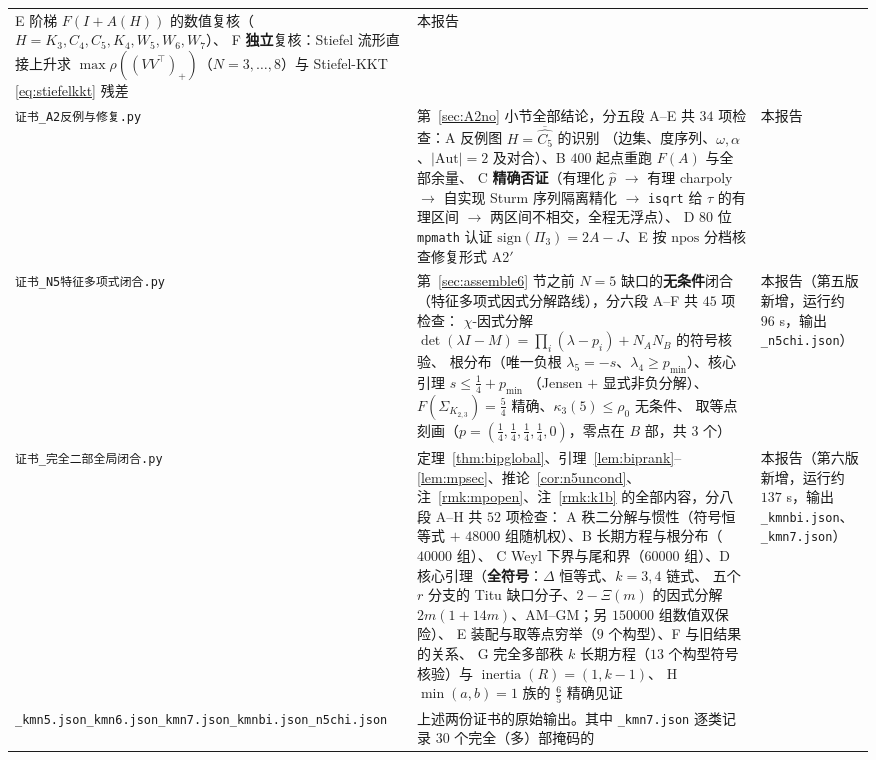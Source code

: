 \documentclass[UTF8,11pt]{ctexart}
\theoremstyle{definition}
\begin{document}
{\begin{longtable}{@{}p{6.9cm}p{6.4cm}p{2.0cm}@{}}
E 阶梯 $F(I+A(H))$ 的数值复核（$H=K_3,C_4,C_5,K_4,W_5,W_6,W_7$）、
F \textbf{独立}复核：Stiefel 流形直接上升求 $\max\rho((VV^\top)_+)$（$N=3,\dots,8$）与 Stiefel-KKT \eqref{eq:stiefelkkt} 残差 &
本报告 \\
\texttt{证书\_A2反例与修复.py} &
第~\ref{sec:A2no} 小节全部结论，分五段 A--E 共 $34$ 项检查：A 反例图 $H=\overline{\widehat{C_5}}$ 的识别
（边集、度序列、$\omega,\alpha$、$|\mathrm{Aut}|=2$ 及对合）、B $400$ 起点重跑 $F(A)$ 与全部余量、
C \textbf{精确否证}（有理化 $\hat p$ $\to$ 有理 charpoly $\to$ 自实现 Sturm 序列隔离精化 $\to$
\texttt{isqrt} 给 $\tau$ 的有理区间 $\to$ 两区间不相交，全程无浮点）、
D $80$ 位 \texttt{mpmath} 认证 $\mathrm{sign}(\Pi_3)=2A-J$、E 按 $\mathrm{npos}$ 分档核查修复形式 A2$'$ &
本报告 \\
\texttt{证书\_N5特征多项式闭合.py} &
第~\ref{sec:assemble6} 节之前 $N=5$ 缺口的\textbf{无条件}闭合（特征多项式因式分解路线），分六段 A--F 共 $45$ 项检查：
$\chi$-因式分解 $\det(\lambda I-M)=\prod_i(\lambda-p_i)+N_AN_B$ 的符号核验、
根分布（唯一负根 $\lambda_5=-s$、$\lambda_4\ge p_{\min}$）、核心引理 $s\le\frac14+p_{\min}$
（Jensen $+$ 显式非负分解）、$F(\Sigma_{K_{2,3}})=\frac54$ 精确、$\kappa_3(5)\le\rho_0$ 无条件、
取等点刻画（$p=(\frac14,\frac14,\frac14,\frac14,0)$，零点在 $B$ 部，共 $3$ 个） &
本报告（第五版新增，运行约 $96$ s，输出 \texttt{\_n5chi.json}） \\
\texttt{证书\_完全二部全局闭合.py} &
定理~\ref{thm:bipglobal}、引理~\ref{lem:biprank}--\ref{lem:mpsec}、推论~\ref{cor:n5uncond}、
注~\ref{rmk:mpopen}、注~\ref{rmk:k1b} 的全部内容，分八段 A--H 共 $52$ 项检查：
A 秩二分解与惯性（符号恒等式 $+$ $48000$ 组随机权）、B 长期方程与根分布（$40000$ 组）、
C Weyl 下界与尾和界（$60000$ 组）、D 核心引理（\textbf{全符号}：$\Delta$ 恒等式、$k=3,4$ 链式、
五个 $r$ 分支的 Titu 缺口分子、$2-\Xi(m)$ 的因式分解 $2m(1+14m)$、AM--GM；另 $150000$ 组数值双保险）、
E 装配与取等点穷举（$9$ 个构型）、F 与旧结果的关系、
G 完全多部秩 $k$ 长期方程（$13$ 个构型符号核验）与 $\operatorname{inertia}(R)=(1,k-1)$、
H $\min(a,b)=1$ 族的 $\frac65$ 精确见证 &
本报告（第六版新增，运行约 $137$ s，输出 \texttt{\_kmnbi.json}、\texttt{\_kmn7.json}） \\
\texttt{\_kmn5.json}\newline\texttt{\_kmn6.json}\newline\texttt{\_kmn7.json}\newline\texttt{\_kmnbi.json}\newline\texttt{\_n5chi.json} &
上述两份证书的原始输出。其中 \texttt{\_kmn7.json} 逐类记录 $30$ 个完全（多）部掩码的

\end{longtable}}
\end{document}
